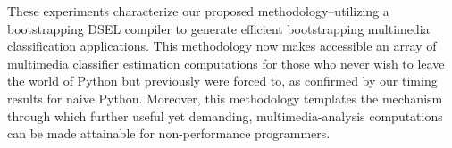 These experiments characterize our proposed methodology--utilizing a bootstrapping DSEL compiler to generate efficient bootstrapping multimedia classification applications. This methodology now makes accessible an array of multimedia classifier estimation computations for those who never wish to leave the world of Python but previously were forced to, as confirmed by our timing results for naive Python. Moreover, this methodology templates the mechanism through which further useful yet demanding, multimedia-analysis computations can be made attainable for non-performance programmers. 
